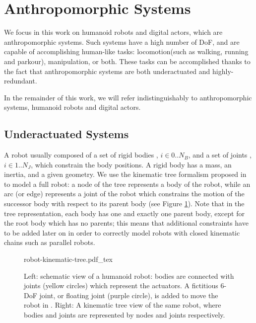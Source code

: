 \section{Anthropomorphic Systems}
\label{sec:chap1-anthropomorphic-systems}

We focus in this work on humanoid robots and digital actors, which are
anthropomorphic systems. Such systems have a high number of DoF, and
are capable of accomplishing human-like tasks: locomotion(such as
walking, running and parkour), manipulation, or both. These tasks can
be accomplished thanks to the fact that anthropomorphic systems are
both underactuated and highly-redundant.

In the remainder of this work, we will refer indistinguishably to
anthropomorphic systems, humanoid robots and digital actors.

\subsection{Underactuated Systems}
\label{subsec:chap1-underactuated-systems}

A robot \robot usually composed of a set of rigid bodies , $i
\in 0..N_B$, and a set of joints , $i \in 1..N_J$, which
constrain the body positions. A rigid body has a mass, an inertia, and
a given geometry. We use the kinematic tree formalism proposed in
\cite{feat08} to model a full robot: a node of the tree represents a
body of the robot, while an arc (or edge) represents a joint 
of the robot which constrains the motion of the successor body
 with respect to its parent body  (see
Figure \ref{fig:chap1-robot-kinematic-tree}). Note that in the tree
representation, each body has one and exactly one parent body, except
for the root body which has no parents; this means that additional
constraints have to be added later on in order to correctly model
robots with closed kinematic chains such as parallel robots.

\begin{figure}
  \centering
      {\def\svgwidth{0.8\linewidth}
        
                   {robot-kinematic-tree.pdf_tex}}
      \caption{Left: schematic view of a humanoid robot: bodies
        are connected with joints (yellow circles) which represent the
        actuators. A fictitious 6-DoF joint, or floating joint (purple
        circle), is added to move the robot in \segroup. Right: A
        kinematic tree view of the same robot, where bodies and joints
        are represented by nodes and joints respectively.}
      \label{fig:chap1-robot-kinematic-tree}
\end{figure}

